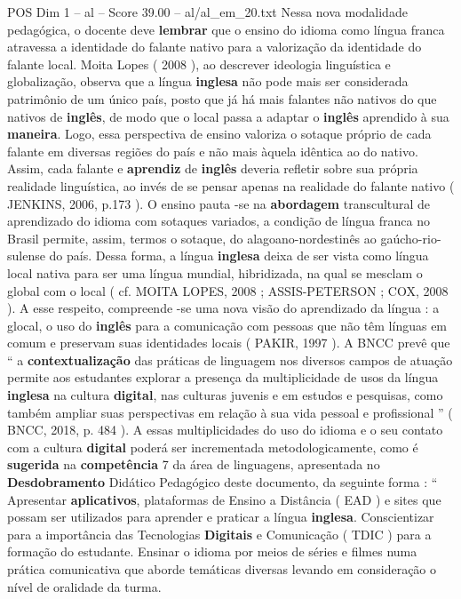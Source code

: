 \begin{textsample}{POS Dim 1 – al – Score 39.00 – al/al\_em\_20.txt}
Nessa nova modalidade pedagógica, o docente deve \textbf{lembrar} que o ensino do idioma como língua franca atravessa a identidade do falante nativo para a valorização da identidade do falante local.
Moita Lopes ( 2008 ), ao descrever ideologia linguística e globalização, observa que a língua \textbf{inglesa} não pode mais ser considerada patrimônio de um único país, posto que já há mais falantes não nativos do que nativos de \textbf{inglês}, de modo que o local passa a adaptar o \textbf{inglês} aprendido à sua \textbf{maneira}.
Logo, essa perspectiva de ensino valoriza o sotaque próprio de cada falante em diversas regiões do país e não mais àquela idêntica ao do nativo.
Assim, cada falante e \textbf{aprendiz} de \textbf{inglês} deveria refletir sobre sua própria realidade linguística, ao invés de se pensar apenas na realidade do falante nativo ( JENKINS, 2006, p.173 ).
O ensino pauta -se na \textbf{abordagem} transcultural de aprendizado do idioma com sotaques variados, a condição de língua franca no Brasil permite, assim, termos o sotaque, do alagoano-nordestinês ao gaúcho-rio-sulense do país.
Dessa forma, a língua \textbf{inglesa} deixa de ser vista como língua local nativa para ser uma língua mundial, hibridizada, na qual se mesclam o global com o local ( cf.
MOITA LOPES, 2008 ; ASSIS-PETERSON ; COX, 2008 ).
A esse respeito, compreende -se uma nova visão do aprendizado da língua : a glocal, o uso do \textbf{inglês} para a comunicação com pessoas que não têm línguas em comum e preservam suas identidades locais ( PAKIR, 1997 ).
A BNCC prevê que “ a \textbf{contextualização} das práticas de linguagem nos diversos campos de atuação permite aos estudantes explorar a presença da multiplicidade de usos da língua \textbf{inglesa} na cultura \textbf{digital}, nas culturas juvenis e em estudos e pesquisas, como também ampliar suas perspectivas em relação à sua vida pessoal e profissional ” ( BNCC, 2018, p. 484 ).
A essas multiplicidades do uso do idioma e o seu contato com a cultura \textbf{digital} poderá ser incrementada metodologicamente, como é \textbf{sugerida} na \textbf{competência} 7 da área de linguagens, apresentada no \textbf{Desdobramento} Didático Pedagógico deste documento, da seguinte forma : “ Apresentar \textbf{aplicativos}, plataformas de Ensino a Distância ( EAD ) e sites que possam ser utilizados para aprender e praticar a língua \textbf{inglesa}.
Conscientizar para a importância das Tecnologias \textbf{Digitais} e Comunicação ( TDIC ) para a formação do estudante.
Ensinar o idioma por meios de séries e filmes numa prática comunicativa que aborde temáticas diversas levando em consideração o nível de oralidade da turma.

\end{textsample}
